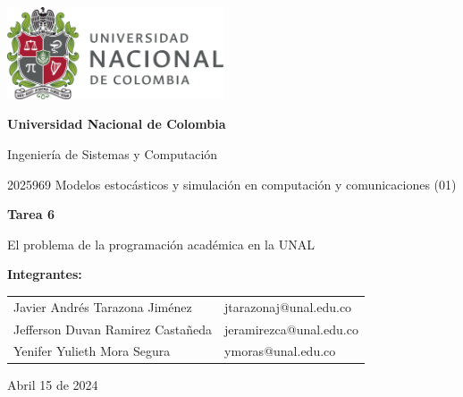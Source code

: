 \documentclass{article}
\begin{document}
\begin{titlepage}
    \centering
    \includegraphics[width=0.48\textwidth]{logo_universidad.png}
    \par\vspace{2cm}

    {\Large \textbf{Universidad Nacional de Colombia} \par}
    \vspace{0.5cm}
    {\large Ingeniería de Sistemas y Computación \par}
    {\large 2025969 Modelos estocásticos y simulación en computación y comunicaciones (01)\par}
    \vspace{3cm}

    {\large \textbf{Tarea 6} \par}
    {\large El problema de la programación académica en la UNAL \par}
    \vspace{3cm}

    {\large \textbf{Integrantes:} \par}
    \vspace{0.5cm}
    \begin{tabular}{ll}
    Javier Andrés Tarazona Jiménez & jtarazonaj@unal.edu.co \\
    Jefferson Duvan Ramirez Castañeda & jeramirezca@unal.edu.co \\
    Yenifer Yulieth Mora Segura & ymoras@unal.edu.co \\
    \end{tabular}
    \par\vspace{3cm}

    {\large Abril 15 de 2024 \par}
\end{titlepage}

\tableofcontents %

\newpage %
\end{document}
